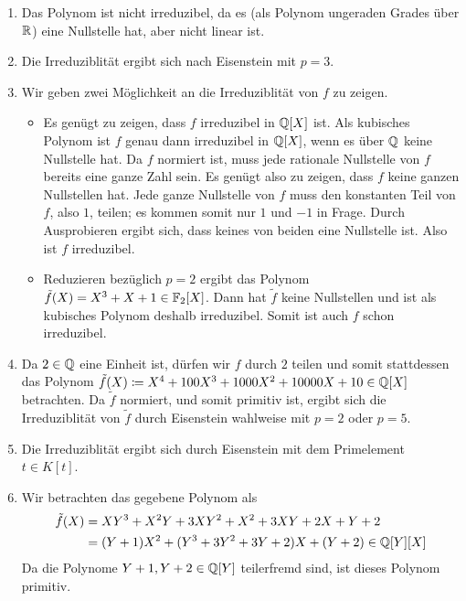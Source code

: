 \begin{solution}
\begin{enumerate}
    \item
      Das Polynom ist nicht irreduzibel, da es (als Polynom ungeraden Grades über $\mathbb{R}$) eine Nullstelle hat, aber nicht linear ist.
    \item
      Die Irreduziblität ergibt sich nach Eisenstein mit $p = 3$.
    \item
      Wir geben zwei Möglichkeit an die Irreduziblität von $f$ zu zeigen.
      \begin{itemize}
        \item
          Es genügt zu zeigen, dass $f$ irreduzibel in $\mathbb{Q}[X]$ ist.
          Als kubisches Polynom ist $f$ genau dann irreduzibel in $\mathbb{Q}[X]$, wenn es über $\mathbb{Q}$ keine Nullstelle hat.
          Da $f$ normiert ist, muss jede rationale Nullstelle von $f$ bereits eine ganze Zahl sein.
          Es genügt also zu zeigen, dass $f$ keine ganzen Nullstellen hat.
          Jede ganze Nullstelle von $f$ muss den konstanten Teil von $f$, also $1$, teilen;
          es kommen somit nur $1$ und $-1$ in Frage.
          Durch Ausprobieren ergibt sich, dass keines von beiden eine Nullstelle ist.
          Also ist $f$ irreduzibel.
        \item
          Reduzieren bezüglich $p = 2$ ergibt das Polynom $\tilde{f}(X) = X^3 + X + 1 \in \mathbb{F}_2[X]$.
          Dann hat $\tilde{f}$ keine Nullstellen und ist als kubisches Polynom deshalb irreduzibel.
          Somit ist auch $f$ schon irreduzibel.
      \end{itemize}
    \item
      Da $2 \in \mathbb{Q}$ eine Einheit ist, dürfen wir $f$ durch $2$ teilen und somit stattdessen das Polynom $\tilde{f}(X) \coloneqq X^4 + 100 X^3 + 1000 X^2 + 10000 X + 10 \in \mathbb{Q}[X]$ betrachten.
      Da $\tilde{f}$ normiert, und somit primitiv ist, ergibt sich die Irreduziblität von $\tilde{f}$ durch Eisenstein wahlweise mit $p = 2$ oder $p = 5$.
    \item
      Die Irreduziblität ergibt sich durch Eisenstein mit dem Primelement $t \in K[t]$.
    \item
      Wir betrachten das gegebene Polynom als
      \begin{align*}
            \tilde{f}(X)
        &=  X Y^3 + X^2 Y + 3 X Y^2 + X^2 + 3 X Y + 2 X + Y + 2
        \\
        &=  (Y + 1) X^2 + (Y^3 + 3 Y^2 + 3 Y + 2) X + (Y + 2)
        \in \mathbb{Q}[Y][X]
      \end{align*}
      Da die Polynome $Y+1, Y + 2 \in \mathbb{Q}[Y]$ teilerfremd sind, ist dieses Polynom primitiv.

\end{enumerate}
\end{solution}
